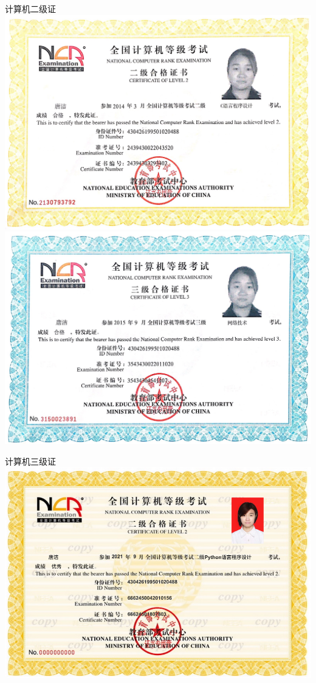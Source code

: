 \documentclass[UFT8]{ctexart}%
\begin{document}
\begin{center}
计算机二级证
  \includegraphics[scale=0.22]{figs/计算机二级C.JPG }
  \includegraphics[scale=0.22]{figs/计算机三级证书.JPG }
   
计算机三级证
   \includegraphics[scale=0.45]{figs/计算机二级Python.JPG }


\end{center}
\end{document}
